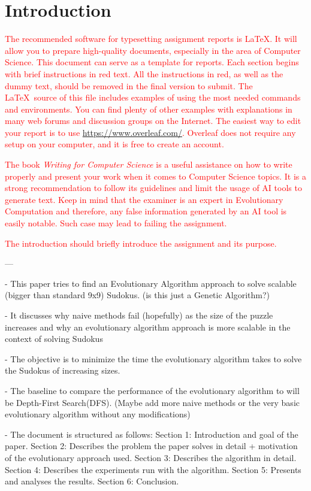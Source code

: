 \section{Introduction}
\label{sec:intro}

\textcolor{red}{The recommended software for typesetting assignment reports is \LaTeX. It will allow you to prepare high-quality documents, especially in the area of Computer Science. This document can serve as a template for reports. Each section begins with brief instructions in red text. All the instructions in red, as well as the dummy text, should be removed in the final version to submit. The \LaTeX\ source of this file includes examples of using the most needed commands and environments. You can find plenty of other examples with explanations in many web forums and discussion groups on the Internet. The easiest way to edit your report is to use \url{https://www.overleaf.com/}. Overleaf does not require any setup on your computer, and it is free to create an account.}

\textcolor{red}{The book \textit{Writing for Computer Science} \cite{zobel2014writing} is a useful assistance on how to write properly and present your work when it comes to Computer Science topics. It is a strong recommendation to follow its guidelines and limit the usage of AI tools to generate text. Keep in mind that the examiner is an expert in Evolutionary Computation and therefore, any false information generated by an AI tool is easily notable. Such case may lead to failing the assignment.}

\textcolor{red}{The introduction should briefly introduce the assignment and its purpose.}

---

- This paper tries to find an Evolutionary Algorithm approach to solve scalable (bigger than standard 9x9) Sudokus. 
(is this just a Genetic Algorithm?)

- It discusses why naive methods fail (hopefully) as the size of the puzzle increases and why an evolutionary algorithm approach is more scalable in the context of solving Sudokus

- The objective is to minimize the time the evolutionary algorithm takes to solve the Sudokus of increasing sizes.

- The baseline to compare the performance of the evolutionary algorithm to will be Depth-First Search(DFS). (Maybe add more naive methods or the very basic evolutionary algorithm without any modifications)

- The document is structured as follows:
Section 1: Introduction and goal of the paper.
Section 2: Describes the problem the paper solves in detail + motivation of the evolutionary approach used.
Section 3: Describes the algorithm in detail.
Section 4: Describes the experiments run with the algorithm.
Section 5: Presents and analyses the results.
Section 6: Conclusion.

